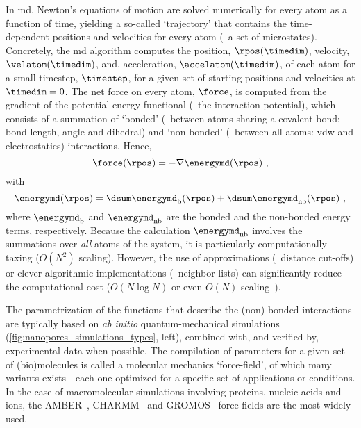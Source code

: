 In \gls{md}, Newton's equations of motion are solved numerically for every atom as a function of time,
yielding a so-called `trajectory' that contains the time-dependent positions and velocities for every atom
(\ie~a set of microstates). Concretely, the \gls{md} algorithm computes the position, $\rpos(\timedim)$,
velocity, $\velatom(\timedim)$, and, acceleration, $\accelatom(\timedim)$, of each atom for a small
timestep\footnotemark, $\timestep$, for a given set of starting positions and velocities at $\timedim = 0$.%
%
%
The net force on every atom, $\force$, is computed from the gradient of the potential energy functional
(\ie~the interaction potential), which consists of a summation of `bonded' (\ie~between atoms sharing a
covalent bond: bond length, angle and dihedral) and `non-bonded' (\ie~between all atoms: \gls{vdw} and
electrostatics) interactions. Hence,
%
\begin{equation}\label{eq:nanopores_md_force}
  \force (\rpos) = - \nabla \energymd (\rpos)
  \text{ ,}
\end{equation}
%
with
%
\begin{equation}\label{eq:nanopores_md_energy}
  \energymd (\rpos) = \dsum \energymd_{\text{b}} (\rpos) + \dsum \energymd_{\text{nb}} (\rpos)
  \text{ ,}
\end{equation}
%
where $\energymd_{\text{b}}$ and $\energymd_{\text{nb}}$ are the bonded and the non-bonded energy terms,
respectively. Because the calculation $\energymd_{\text{nb}}$ involves the summations over \emph{all} atoms of
the system, it is particularly computationally taxing ($O(N^2)$ scaling). However, the use of approximations
(\eg~distance cut-offs) or clever algorithmic implementations (\eg~neighbor lists) can significantly reduce
the computational cost ($O(N\log N)$ or even $O(N)$ scaling~\cite{Eastman-2010}).

The parametrization of the functions that describe the (non)-bonded interactions are typically based on
\textit{ab initio} quantum-mechanical simulations (\cref{fig:nanopores_simulations_types}, left), combined
with, and verified by, experimental data when possible. The compilation of parameters for a given set of
(bio)molecules is called a molecular mechanics `force-field', of which many variants exists---each one
optimized for a specific set of applications or conditions. In the case of macromolecular simulations
involving proteins, nucleic acids and ions, the {AMBER}~\cite{Ponder-2003}, {CHARMM}~\cite{Huang-2016} and
{GROMOS}~\cite{Oostenbrink-2004} force fields are the most widely used.

